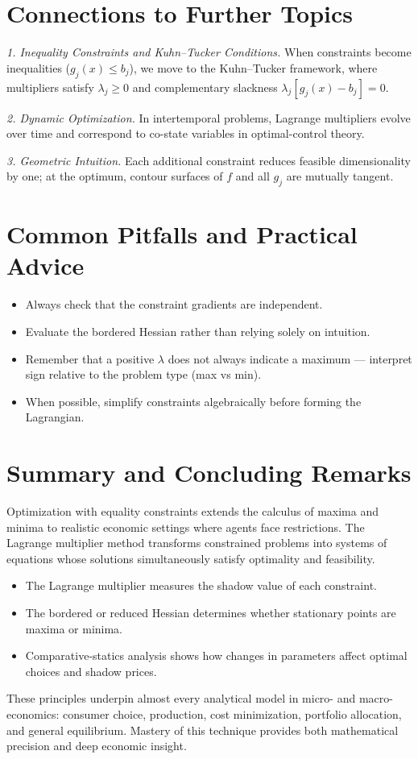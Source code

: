 \documentclass[12pt]{article}
\begin{document}
\section*{Connections to Further Topics}

\textit{1. Inequality Constraints and Kuhn–Tucker Conditions.}  
When constraints become inequalities (\(g_j(x)\le b_j\)), we move to the Kuhn–Tucker framework, where multipliers satisfy \(\lambda_j\ge0\) and complementary slackness \(\lambda_j[g_j(x)-b_j]=0.\)

\textit{2. Dynamic Optimization.}  
In intertemporal problems, Lagrange multipliers evolve over time and correspond to co-state variables in optimal-control theory.

\textit{3. Geometric Intuition.}  
Each additional constraint reduces feasible dimensionality by one; at the optimum, contour surfaces of \(f\) and all \(g_j\) are mutually tangent.

\section*{Common Pitfalls and Practical Advice}

\begin{itemize}[leftmargin=1em]
\item Always check that the constraint gradients are independent.
\item Evaluate the bordered Hessian rather than relying solely on intuition.
\item Remember that a positive \(\lambda\) does not always indicate a maximum — interpret sign relative to the problem type (max vs min).
\item When possible, simplify constraints algebraically before forming the Lagrangian.
\end{itemize}

\section*{Summary and Concluding Remarks}

Optimization with equality constraints extends the calculus of maxima and minima to realistic economic settings where agents face restrictions.  
The Lagrange multiplier method transforms constrained problems into systems of equations whose solutions simultaneously satisfy optimality and feasibility.  

\begin{itemize}[leftmargin=1em]
\item The Lagrange multiplier measures the shadow value of each constraint.  
\item The bordered or reduced Hessian determines whether stationary points are maxima or minima.  
\item Comparative-statics analysis shows how changes in parameters affect optimal choices and shadow prices.  
\end{itemize}

These principles underpin almost every analytical model in micro- and macro-economics: consumer choice, production, cost minimization, portfolio allocation, and general equilibrium.  
Mastery of this technique provides both mathematical precision and deep economic insight.
\end{document}

